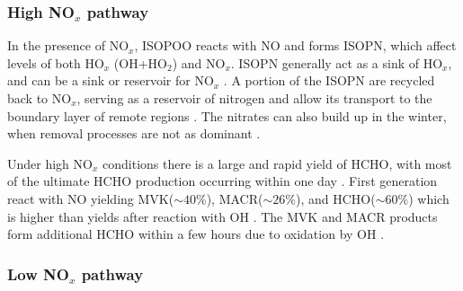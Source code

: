       
      
    \subsubsection{High NO$_x$ pathway}
      In the presence of NO$_x$, ISOPOO reacts with NO and forms ISOPN, which affect levels of both HO$_x$ (OH+HO$_2$) and NO$_x$.
      ISOPN generally act as a sink of HO$_x$, and can be a sink or reservoir for NO$_x$ \parencite[][]{Mao2013, Fisher2016}. 
      A portion of the ISOPN are recycled back to NO$_x$, serving as a reservoir of nitrogen and allow its transport to the boundary layer of remote regions \parencite{Patchen2007, Paulot2009a}.
      The nitrates can also build up in the winter, when removal processes are not as dominant \parencite{Lelieveld2009}.
      
      Under high NO$_x$ conditions there is a large and rapid yield of HCHO, with most of the ultimate HCHO production occurring within one day \parencite{Palmer2006}.
      First generation \roo react with NO yielding MVK($\sim 40\%$), MACR($\sim 26\%$), and HCHO($\sim 60\%$) which is higher than yields after reaction with OH \parencite{Liu2013, Mao2013}.
      The MVK and MACR products form additional HCHO within a few hours due to oxidation by OH \parencite{Palmer2006}.
      
      
      
    
    \subsubsection{Low NO$_x$ pathway}
      
